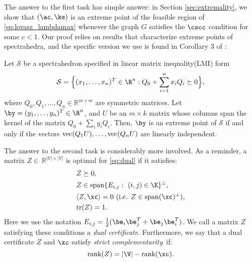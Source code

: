 The answer to the first task has simple answer: in Section \ref{sec:extremality}, we show that $(\ac,\ks)$ is an extreme point of the feasible region of \eqref{eq:lovasz_lambdamax} whenever the graph $G$ satisfies the $\cscc$ condition for some $c < 1$.  Our proof relies on results that characterize extreme points of spectrahedra, and the specific version we use is found in Corollary 3 of \cite{RG:95}:
\begin{theorem}\label{thm:extremal_rg}
Let $\mathcal{S}$ be a spectrahedron specified in linear matrix inequality(LMI)  form
\begin{equation} \label{eq:LMI}
\mathcal{S}=\Big \{ (x_1, \ldots, x_n)^T \in \R^n : Q_0 +\sum_{i=1}^n x_i Q_i \succeq 0 \Big \},
\end{equation} 
where $Q_0,Q_1,\ldots, Q_n \in \mathbb{R}^{m \times m}$ are symmetric matrices.  Let $\by = (y_1,\ldots, y_n)^T \in \R^n$, and $U$ be an $m\times k$ matrix whose columns span the kernel of the matrix $Q_0 +\sum_i y_i Q_i$. Then, $\by$ is an extreme point of $\mathcal{S}$ if and only if the vectors ${\rm vec}(Q_1U), \ldots, {\rm vec}(Q_nU)$ are linearly independent. 
\end{theorem}


The answer to the second task is considerably more involved.  As a reminder, a matrix $Z \in~\mathbb{R}^{|V| \times |V|}$ is optimal  for \eqref{eq:dual}  if it satisfies:
\begin{align} 
& Z \succeq 0 \label{cond1}, \\    
& Z \in {\rm span}\{E_{i,j}: \ (i,j)\in \E \}^\perp \label{eq:supportcondition}, \\
& \langle Z, \xc \rangle = 0 ~ (\text{i.e. } Z \in {\rm span}(\xc )^\perp)\label{eq:complementaryslackness}, \\ 
& \mathrm{tr}(Z) = 1. \label{eq:traceone}
\end{align}
Here we use the notation $E_{i,j}={1\over 2}(\be_i \be_j^T+\be_j \be_i^T)$.  We call a matrix $Z$ satisfying these conditions a {\em dual certificate}.  Furthermore, we say that a dual certificate  $Z$ and $\xc$ satisfy  {\em strict complementarity}~if:%
\begin{equation}
{\rm rank}(Z)=|\V| - {\rm rank}(\xc) \label{cond3}.
\end{equation}



